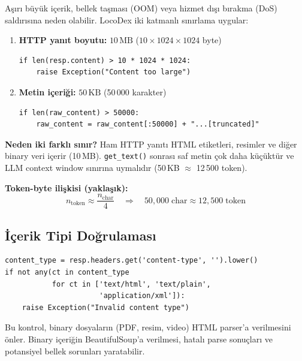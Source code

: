 A\c{s}{\i}r{\i} b\"{u}y\"{u}k i\c{c}erik, bellek ta\c{s}mas{\i} (OOM) veya hizmet d{\i}\c{s}{\i} b{\i}rakma (DoS) sald{\i}r{\i}s{\i}na neden olabilir. LocoDex iki katmanl{\i} s{\i}n{\i}rlama uygular:

\begin{enumerate}
  \item \textbf{HTTP yan{\i}t boyutu:} $10\,\text{MB}$ ($10 \times 1024 \times 1024$ byte)
\begin{verbatim}
if len(resp.content) > 10 * 1024 * 1024:
    raise Exception("Content too large")
\end{verbatim}

  \item \textbf{Metin i\c{c}eri\u{g}i:} $50\,\text{KB}$ (50\,000 karakter)
\begin{verbatim}
if len(raw_content) > 50000:
    raw_content = raw_content[:50000] + "...[truncated]"
\end{verbatim}
\end{enumerate}

\textbf{Neden iki farkl{\i} s{\i}n{\i}r?} Ham HTTP yan{\i}t{\i} HTML etiketleri, resimler ve di\u{g}er binary veri i\c{c}erir (10\,MB). \texttt{get\_text()} sonras{\i} saf metin \c{c}ok daha k\"{u}\c{c}\"{u}kt\"{u}r ve LLM context window s{\i}n{\i}r{\i}na uymal{\i}d{\i}r (50\,KB $\approx$ 12\,500 token).

\textbf{Token-byte ili\c{s}kisi (yakla\c{s}{\i}k):}
\begin{equation}
\label{eq:token-byte}
n_{\text{token}} \approx \frac{n_{\text{char}}}{4} \quad \Rightarrow \quad 50{,}000\;\text{char} \approx 12{,}500\;\text{token}
\end{equation}

\subsection{\.{I}\c{c}erik Tipi Do\u{g}rulamas{\i}}

\begin{verbatim}
content_type = resp.headers.get('content-type', '').lower()
if not any(ct in content_type
           for ct in ['text/html', 'text/plain',
                      'application/xml']):
    raise Exception("Invalid content type")
\end{verbatim}

Bu kontrol, binary dosyalar{\i}n (PDF, resim, video) HTML parser'a verilmesini \"{o}nler. Binary i\c{c}eri\u{g}in BeautifulSoup'a verilmesi, hatal{\i} parse sonu\c{c}lar{\i} ve potansiyel bellek sorunlar{\i} yaratabilir.

